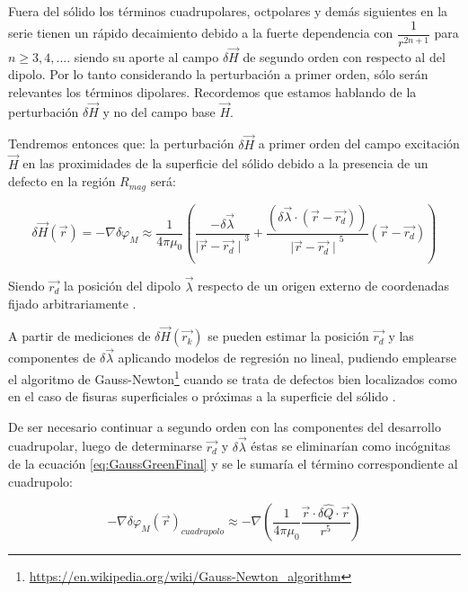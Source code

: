 Fuera del sólido los términos cuadrupolares, octpolares y demás siguientes en la serie tienen  un rápido decaimiento debido a la fuerte dependencia con $\dfrac{1}{r^{2n+1}}$ para $n \geq 3, 4, ... $. siendo su aporte al campo $\delta\vec{H}$ de segundo orden con respecto al del dipolo. Por lo tanto considerando la perturbación a primer orden, sólo serán relevantes los términos dipolares. Recordemos que estamos hablando de la perturbación $\delta\vec{H}$ y no del campo base $\vec{H}$.     

Tendremos entonces que: la perturbación $\delta\vec{H}$ a primer orden del campo excitación $\vec{H}$ en las proximidades de la superficie del sólido debido a la presencia de un defecto en la región $R_{mag}$ será:

\begin{equation}
	\label{eq:GaussGreenFinal}
	\delta\vec{H}(\vec{r}) = -\nabla\delta\varphi_{M} \approx \dfrac{1}{4\pi\mu_{0}}\left(  
	\dfrac{-\delta\vec{\lambda}}{{\mid\vec{r}-\vec{r_{d}}\mid}^3} + 
	\dfrac{	\left( \delta\vec{\lambda} \cdot \left( \vec{r}-\vec{r_{d}} \right) \right) }{ {\mid\vec{r}-\vec{r_{d}}\mid}^5} 
	\left( \vec{r}-\vec{r_{d}} \right) \right) 
\end{equation}


Siendo $\vec{r_{d}}$ la posición del dipolo $\vec{\lambda}$ respecto de un origen externo de coordenadas fijado arbitrariamente .

A partir de mediciones de $\delta\vec{H}(\vec{r_{k}}) $ se pueden estimar la posición $\vec{r_{d}}$ y las componentes de $\delta\vec\lambda$ aplicando modelos de regresión no lineal\citep{EstimacionNoLineal1}, pudiendo emplearse el algoritmo de Gauss-Newton\footnote{\url{https://en.wikipedia.org/wiki/Gauss-Newton\_algorithm}} cuando se trata de defectos bien localizados como en el caso de fisuras superficiales o próximas a la superficie del sólido . 


De ser necesario continuar a segundo orden con las componentes del desarrollo cuadrupolar, luego de determinarse $\vec{r_{d}}$ y $\delta\vec\lambda$ éstas se eliminarían como incógnitas de la ecuación \ref{eq:GaussGreenFinal} y se le sumaría el término correspondiente al cuadrupolo: 

\begin{equation}
	\label{eq:GaussGreenCuadrupoloFinal}
	-\nabla\delta\varphi_{M}(\vec{r})_{cuadrupolo} \approx 
	-\nabla \left( \dfrac{1}{4\pi\mu_{0}} 
	\dfrac{\vec{r} \cdot \delta\hat{Q} \cdot \vec{r}}{r^5}\right) 
\end{equation}

